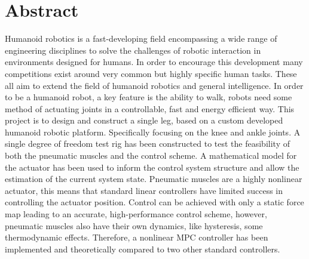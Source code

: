 \section*{Abstract}
Humanoid robotics is a fast-developing field encompassing a wide range of engineering disciplines to solve the challenges of robotic interaction in environments designed for humans. In order to encourage this development many competitions exist around very common but highly specific human tasks. These all aim to extend the field of humanoid robotics and general intelligence.
In order to be a humanoid robot, a key feature is the ability to walk, robots need some method of actuating joints in a controllable, fast and energy efficient way.\newline
This project is to design and construct a single leg, based on a custom developed humanoid robotic platform. Specifically focusing on the knee and ankle joints. A single degree of freedom test rig has been constructed to test the feasibility of both the pneumatic muscles and the control scheme.
A mathematical model for the actuator has been used to inform the control system structure and allow the estimation of the current system state. Pneumatic muscles are a highly nonlinear actuator, this means that standard linear controllers have limited success in controlling the actuator position. Control can be achieved with only a static force map leading to an accurate, high-performance control scheme, however, pneumatic muscles also have their own dynamics, like hysteresis, some thermodynamic effects. \newline
Therefore, a nonlinear MPC controller has been implemented and theoretically compared to two other standard controllers. \newline